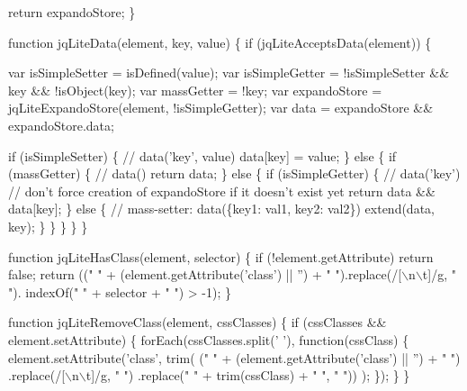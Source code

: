 \begin{DoxyCodeInclude}
{  \textcolor{keywordflow}{return} expandoStore;
\}


\textcolor{keyword}{function} jqLiteData(element, key, value) \{
  \textcolor{keywordflow}{if} (jqLiteAcceptsData(element)) \{

    var isSimpleSetter = isDefined(value);
    var isSimpleGetter = !isSimpleSetter && key && !isObject(key);
    var massGetter = !key;
    var expandoStore = jqLiteExpandoStore(element, !isSimpleGetter);
    var data = expandoStore && expandoStore.data;

    \textcolor{keywordflow}{if} (isSimpleSetter) \{ \textcolor{comment}{// data('key', value)}
      data[key] = value;
    \} \textcolor{keywordflow}{else} \{
      \textcolor{keywordflow}{if} (massGetter) \{  \textcolor{comment}{// data()}
        \textcolor{keywordflow}{return} data;
      \} \textcolor{keywordflow}{else} \{
        \textcolor{keywordflow}{if} (isSimpleGetter) \{ \textcolor{comment}{// data('key')}
          \textcolor{comment}{// don't force creation of expandoStore if it doesn't exist yet}
          \textcolor{keywordflow}{return} data && data[key];
        \} \textcolor{keywordflow}{else} \{ \textcolor{comment}{// mass-setter: data(\{key1: val1, key2: val2\})}
          extend(data, key);
        \}
      \}
    \}
  \}
\}

\textcolor{keyword}{function} jqLiteHasClass(element, selector) \{
  \textcolor{keywordflow}{if} (!element.getAttribute) \textcolor{keywordflow}{return} \textcolor{keyword}{false};
  \textcolor{keywordflow}{return} ((\textcolor{stringliteral}{" "} + (element.getAttribute(\textcolor{stringliteral}{'class'}) || \textcolor{stringliteral}{''}) + \textcolor{stringliteral}{" "}).replace(/[\(\backslash\)n\(\backslash\)t]/g, \textcolor{stringliteral}{" "}).
      indexOf(\textcolor{stringliteral}{" "} + selector + \textcolor{stringliteral}{" "}) > -1);
\}

\textcolor{keyword}{function} jqLiteRemoveClass(element, cssClasses) \{
  \textcolor{keywordflow}{if} (cssClasses && element.setAttribute) \{
    forEach(cssClasses.split(\textcolor{charliteral}{' '}), \textcolor{keyword}{function}(cssClass) \{
      element.setAttribute(\textcolor{stringliteral}{'class'}, trim(
          (\textcolor{stringliteral}{" "} + (element.getAttribute(\textcolor{stringliteral}{'class'}) || \textcolor{stringliteral}{''}) + \textcolor{stringliteral}{" "})
          .replace(/[\(\backslash\)n\(\backslash\)t]/g, \textcolor{stringliteral}{" "})
          .replace(\textcolor{stringliteral}{" "} + trim(cssClass) + \textcolor{stringliteral}{" "}, \textcolor{stringliteral}{" "}))
      );
    \});
  \}
\}

}
\end{DoxyCodeInclude}
